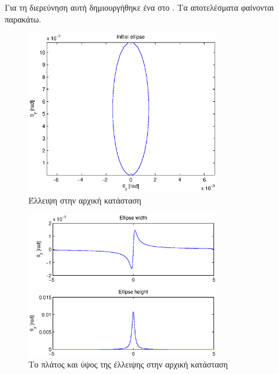 Για τη διερεύνηση αυτή δημιουργήθηκε ένα  στο . Τα αποτελέσματα φαίνονται παρακάτω.

\begin{figure}[tbh]
\includegraphics[width=0.75\textwidth]{figures/beam_deflection_script_01_initial_elipse}
\centering
\caption{Έλλειψη στην αρχική κατάσταση}
\label{fig:beam_deflection_script_01_initial_elipse}
\end{figure}

\begin{figure}[tbh]
\includegraphics[width=0.75\textwidth]{figures/beam_deflection_script_02_elipse_width}
\centering
\caption{Το πλάτος και ύψος της έλλειψης στην αρχική κατάσταση}
\label{fig:beam_deflection_script_02_elipse_width}
\end{figure}


